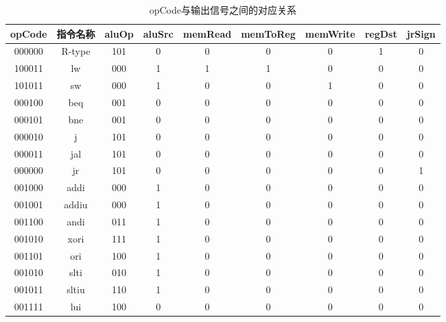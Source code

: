 \begin{table}[H]
    \centering
    \begin{tabular}{c|c|c|c|c|c|c|c|c}
    \hline
        opCode & 指令名称 & aluOp & aluSrc & memRead & memToReg & memWrite & regDst & jrSign \\
        \hline  
        000000 & R-type & 101 & 0 & 0 & 0 & 0 & 1 & 0\\
        100011 & lw & 000 & 1 & 1 & 1 & 0 & 0 & 0\\
        101011 & sw & 000 & 1 & 0 & 0 & 1 & 0 & 0\\
        000100 & beq & 001 & 0 & 0 & 0 & 0 & 0 & 0\\
        000101 & bne & 001 & 0 & 0 & 0 & 0 & 0 & 0\\
        000010 & j & 101 & 0 & 0 & 0 & 0 & 0 & 0\\
        000011 & jal & 101 & 0 & 0 & 0 & 0 & 0 & 0\\
        000000 & jr & 101 & 0 & 0 & 0 & 0 & 0 & 1\\
        001000 & addi & 000 & 1 & 0 & 0 & 0 & 0 & 0\\
        001001 & addiu & 000 & 1 & 0 & 0 & 0 & 0 & 0\\
        001100 & andi & 011 & 1 & 0 & 0 & 0 & 0 & 0\\
        001010 & xori & 111 & 1 & 0 & 0 & 0 & 0 & 0\\
        001101 & ori & 100 & 1 & 0 & 0 & 0 & 0 & 0\\
        001010 & slti & 010 & 1 & 0 & 0 & 0 & 0 & 0\\
        001011 & sltiu & 110 & 1 & 0 & 0 & 0 & 0 & 0\\
        001111 & lui & 100 & 0 & 0 & 0 & 0 & 0 & 0\\
        \hline
    \end{tabular}
    \caption{opCode与输出信号之间的对应关系}
    \label{4}
\end{table}


